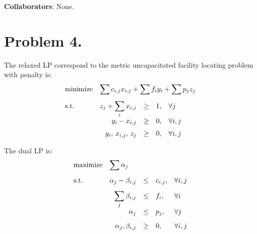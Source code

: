 \documentclass[12pt, a4paper]{article}
\begin{document}
{\bf Collaborators}: None.

\section{Problem 4.}
The relaxed LP correspond to the metric uncapacitated facility locating problem with penalty is:
\begin{equation} \label{eq:facil-lp}
  \begin{array}{>{\displaystyle}l>{\displaystyle}r>{\displaystyle}c*2{>{\displaystyle}l}}
    \text{minimize} & \multicolumn{4}{l}{\displaystyle \sum c_{i,j} x_{i,j} + \sum f_i y_i + \sum p_j z_j} \\[10pt]
    \text{s.t.} & z_j + \sum_i x_{i, j} & \geq & 1, & \forall j \\
    & y_i - x_{i, j} & \geq & 0, & \forall i, j \\[6pt]
    & y_i,\, x_{i, j},\, z_j & \geq & 0, & \forall i, j
  \end{array}
\end{equation}

The dual LP is:
\begin{equation} \label{eq:facil-dual-lp}
  \begin{array}{>{\displaystyle}l>{\displaystyle}r>{\displaystyle}c*2{>{\displaystyle}l}}
    \text{maximize} & \multicolumn{4}{l}{\displaystyle \sum \alpha_j} \\[10pt]
    \text{s.t.} & \alpha_j - \beta_{i, j} & \leq & c_{i, j}, & \forall i, j \\[8pt]
    & \sum_j \beta_{i,j} & \leq & f_i, & \forall i \\
    & \alpha_j & \leq & p_j, & \forall j \\[8pt]
    & \alpha_j, \beta_{i, j} & \geq & 0, & \forall i, j
  \end{array}
\end{equation}
\end{document}
